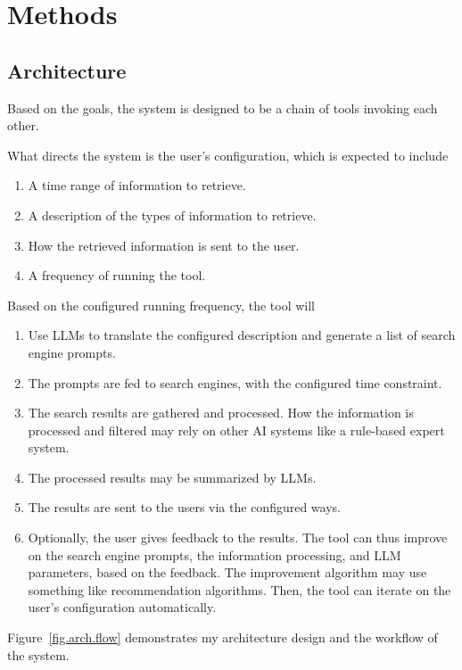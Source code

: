 \documentclass[project-plan]{report-template}
\begin{document}
\section{Methods} 
\subsection{Architecture}
Based on the goals, the system is designed to be a chain of tools invoking each
other.

What directs the system is the user's configuration, which is expected to
include
\begin{enumerate}
	\item A time range of information to retrieve.
	\item A description of the types of information to
		retrieve.
	\item How the retrieved information is sent to the user.
	\item A frequency of running the tool.
\end{enumerate}

Based on the configured running frequency, the tool will
\begin{enumerate}
	\item Use LLMs to translate the configured description and generate a list
		of search engine prompts.
	\item The prompts are fed to search engines, with the configured time
		constraint.
	\item The search results are gathered and processed. How the information is
		processed and filtered may rely on other AI systems like a
		rule-based expert system.
	\item The processed results may be summarized by LLMs.
	\item The results are sent to the users via the configured ways.
	\item Optionally, the user gives feedback to the results. The tool can
		thus improve on the search engine prompts, the information processing,
		and LLM parameters, based on the feedback. The improvement algorithm
		may use something like recommendation algorithms. Then, the tool can
		iterate on the user's configuration automatically.
\end{enumerate}

Figure~\ref{fig.arch.flow} demonstrates my architecture design and the workflow
of the system.
\end{document}
